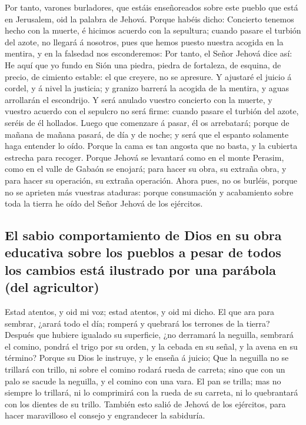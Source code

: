  Por tanto, varones burladores, que estáis enseñoreados
sobre este pueblo que está en Jerusalem, oid la palabra de Jehová.
 Porque habéis dicho: Concierto tenemos hecho con la
muerte, é hicimos acuerdo con la sepultura; cuando pasare el turbión del
azote, no llegará á nosotros, pues que hemos puesto nuestra acogida en
la mentira, y en la falsedad nos esconderemos:  Por
tanto, el Señor Jehová dice así: He aquí que yo fundo en Sión una
piedra, piedra de fortaleza, de esquina, de precio, de cimiento estable:
el que creyere, no se apresure.  Y ajustaré el juicio á
cordel, y á nivel la justicia; y granizo barrerá la acogida de la
mentira, y aguas arrollarán el escondrijo.  Y será
anulado vuestro concierto con la muerte, y vuestro acuerdo con el
sepulcro no será firme: cuando pasare el turbión del azote, seréis de él
hollados.  Luego que comenzare á pasar, él os arrebatará;
porque de mañana de mañana pasará, de día y de noche; y será que el
espanto solamente haga entender lo oído.  Porque la cama
es tan angosta que no basta, y la cubierta estrecha para recoger.
 Porque Jehová se levantará como en el monte Perasim,
como en el valle de Gabaón se enojará; para hacer su obra, su extraña
obra, y para hacer su operación, su extraña operación. 
Ahora pues, no os burléis, porque no se aprieten más vuestras ataduras:
porque consumación y acabamiento sobre toda la tierra he oído del Señor
Jehová de los ejércitos.

\hypertarget{el-sabio-comportamiento-de-dios-en-su-obra-educativa-sobre-los-pueblos-a-pesar-de-todos-los-cambios-estuxe1-ilustrado-por-una-paruxe1bola-del-agricultor}{%
\subsection{El sabio comportamiento de Dios en su obra educativa sobre
los pueblos a pesar de todos los cambios está ilustrado por una parábola
(del
agricultor)}\label{el-sabio-comportamiento-de-dios-en-su-obra-educativa-sobre-los-pueblos-a-pesar-de-todos-los-cambios-estuxe1-ilustrado-por-una-paruxe1bola-del-agricultor}}

 Estad atentos, y oid mi voz; estad atentos, y oid mi
dicho.  El que ara para sembrar, ¿arará todo el día;
romperá y quebrará los terrones de la tierra?  Después
que hubiere igualado su superficie, ¿no derramará la neguilla, sembrará
el comino, pondrá el trigo por su orden, y la cebada en su señal, y la
avena en su término?  Porque su Dios le instruye, y le
enseña á juicio;  Que la neguilla no se trillará con
trillo, ni sobre el comino rodará rueda de carreta; sino que con un palo
se sacude la neguilla, y el comino con una vara.  El pan
se trilla; mas no siempre lo trillará, ni lo comprimirá con la rueda de
su carreta, ni lo quebrantará con los dientes de su trillo.
 También esto salió de Jehová de los ejércitos, para
hacer maravilloso el consejo y engrandecer la sabiduría.


